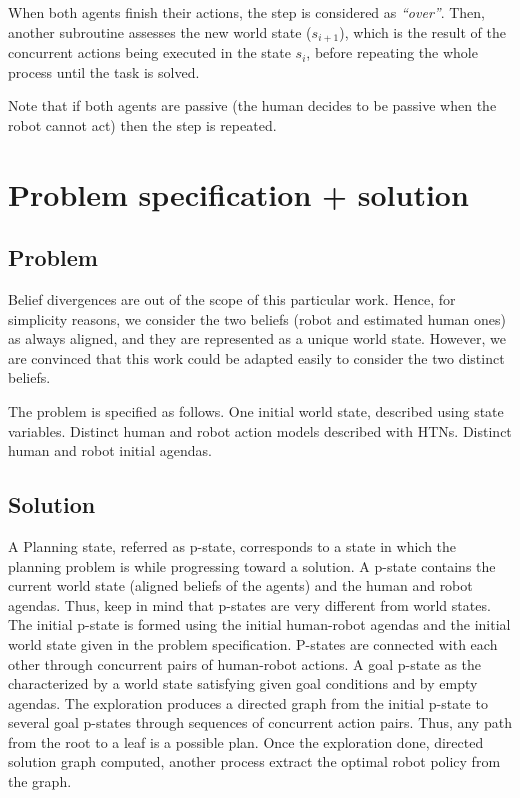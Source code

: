 When both agents finish their actions, the step is considered as \textit{``over''}. 
Then, another subroutine assesses the new world state ($s_{i+1}$), which is the result of the concurrent actions being executed in the state $s_i$, before repeating the whole process until the task is solved.

Note that if both agents are passive (the human decides to be passive when the robot cannot act) then the step is repeated. 

\section{Problem specification + solution}

\subsection{Problem}

Belief divergences are out of the scope of this particular work. Hence, for simplicity reasons, we consider the two beliefs (robot and estimated human ones) as always aligned, and they are represented as a unique world state. However, we are convinced that this work could be adapted easily to consider the two distinct beliefs.

The problem is specified as follows. One initial world state, described using state variables. Distinct human and robot action models described with HTNs. Distinct human and robot initial agendas. 

\subsection{Solution}

A Planning state, referred as p-state, corresponds to a state in which the planning problem is while progressing toward a solution. A p-state contains the current world state (aligned beliefs of the agents) and the human and robot agendas. Thus, keep in mind that p-states are very different from world states.
The initial p-state is formed using the initial human-robot agendas and the initial world state given in the problem specification. P-states are connected with each other through concurrent pairs of human-robot actions. A goal p-state as the characterized by a world state satisfying given goal conditions and by empty agendas.
The exploration produces a directed graph from the initial p-state to several goal p-states through sequences of concurrent action pairs. Thus, any path from the root to a leaf is a possible plan. Once the exploration done, directed solution graph computed, another process extract the optimal robot policy from the graph. 

